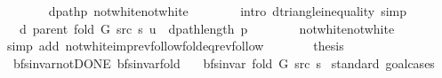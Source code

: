 \begin{isabellebody}
\ \ \ \ \ \ \isamarkupfalse%
\ dpath{\isacharunderscore}{\kern0pt}p\ not{\isacharunderscore}{\kern0pt}white{\isacharunderscore}{\kern0pt}not{\isacharunderscore}{\kern0pt}white\isanewline
\ \ \ \ \ \ \isamarkupfalse%
\ {\isacharparenleft}{\kern0pt}intro\ d{\isacharunderscore}{\kern0pt}triangle{\isacharunderscore}{\kern0pt}inequality{\isacharparenright}{\kern0pt}\ simp{\isacharplus}{\kern0pt}\isanewline
\ \ \ \ \isamarkupfalse%
\ \isamarkupfalse%
\ {\isachardoublequoteopen}{\isachardot}{\kern0pt}{\isachardot}{\kern0pt}{\isachardot}{\kern0pt}\ {\isacharequal}{\kern0pt}\ d\ {\isacharparenleft}{\kern0pt}parent\ {\isacharparenleft}{\kern0pt}fold\ G\ src\ s{\isacharparenright}{\kern0pt}{\isacharparenright}{\kern0pt}\ u\ {\isacharplus}{\kern0pt}\ dpath{\isacharunderscore}{\kern0pt}length\ p{\isachardoublequoteclose}\isanewline
\ \ \ \ \ \ \isamarkupfalse%
\ not{\isacharunderscore}{\kern0pt}white{\isacharunderscore}{\kern0pt}not{\isacharunderscore}{\kern0pt}white\isanewline
\ \ \ \ \ \ \isamarkupfalse%
\ {\isacharparenleft}{\kern0pt}simp\ add{\isacharcolon}{\kern0pt}\ not{\isacharunderscore}{\kern0pt}white{\isacharunderscore}{\kern0pt}imp{\isacharunderscore}{\kern0pt}rev{\isacharunderscore}{\kern0pt}follow{\isacharunderscore}{\kern0pt}fold{\isacharunderscore}{\kern0pt}eq{\isacharunderscore}{\kern0pt}rev{\isacharunderscore}{\kern0pt}follow{\isacharparenright}{\kern0pt}\isanewline
\ \ \ \ \isamarkupfalse%
\ \isamarkupfalse%
\ {\isacharquery}{\kern0pt}thesis\isanewline
\ \ \ \ \ \ \isacommand{{\isachardot}{\kern0pt}}\isamarkupfalse%
\isanewline
\ \ \isamarkupfalse%
\isanewline
{}\isamarkupfalse%
%
\endisatagvisible
{\isafoldvisible}%
%
\isadelimvisible
\isanewline
%
\endisadelimvisible
\isanewline
{}\isamarkupfalse%
\ {\isacharparenleft}{\kern0pt}\ bfs{\isacharunderscore}{\kern0pt}invar{\isacharunderscore}{\kern0pt}not{\isacharunderscore}{\kern0pt}DONE{\isacharparenright}{\kern0pt}\ bfs{\isacharunderscore}{\kern0pt}invar{\isacharunderscore}{\kern0pt}fold{\isacharcolon}{\kern0pt}\isanewline
\ \ \ {\isachardoublequoteopen}bfs{\isacharunderscore}{\kern0pt}invar{\isacharprime}{\kern0pt}{\isacharprime}{\kern0pt}\ {\isacharparenleft}{\kern0pt}fold\ G\ src\ s{\isacharparenright}{\kern0pt}{\isachardoublequoteclose}\isanewline
%
\isadelimproof
%
\endisadelimproof
%
\isatagproof
{}\isamarkupfalse%
\ {\isacharparenleft}{\kern0pt}standard{\isacharcomma}{\kern0pt}\ goal{\isacharunderscore}{\kern0pt}cases{\isacharparenright}{\kern0pt}\isanewline

\end{isabellebody}
